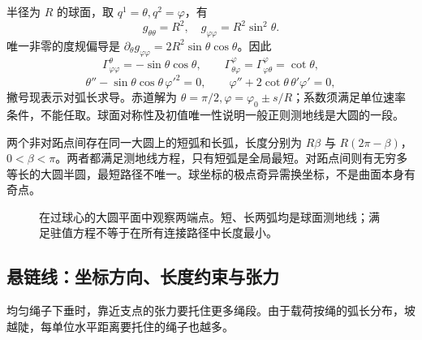 \begin{example}[球面：大圆长弧为何不是最短？]
半径为 $R$ 的球面，取 $q^1=\theta,q^2=\varphi$，有
\[
g_{\theta\theta}=R^2,\quad g_{\varphi\varphi}=R^2\sin^2\theta.
\]
唯一非零的度规偏导是 $\partial_\theta g_{\varphi\varphi}=2R^2\sin\theta\cos\theta$。因此
\[
\Gamma^\theta_{\varphi\varphi}=-\sin\theta\cos\theta,\qquad
\Gamma^\varphi_{\theta\varphi}=\Gamma^\varphi_{\varphi\theta}=\cot\theta,
\]
\[
\theta''-\sin\theta\cos\theta\,\varphi'^2=0,\qquad
\varphi''+2\cot\theta\,\theta'\varphi'=0,
\]
撇号现表示对弧长求导。赤道解为 $\theta=\pi/2,\varphi=\varphi_0\pm s/R$；系数须满足单位速率条件，不能任取。球面对称性及初值唯一性说明一般正则测地线是大圆的一段。

两个非对跖点间存在同一大圆上的短弧和长弧，长度分别为 $R\beta$ 与 $R(2\pi-\beta)$，$0<\beta<\pi$。两者都满足测地线方程，只有短弧是全局最短。对跖点间则有无穷多等长的大圆半圆，最短路径不唯一。球坐标的极点奇异需换坐标，不是曲面本身有奇点。
\end{example}
\begin{figure}[htbp]
\centering
{}
\caption{在过球心的大圆平面中观察两端点。短、长两弧均是球面测地线；满足驻值方程不等于在所有连接路径中长度最小。}
\label{fig:var-great-circle}
\end{figure}

\subsection{悬链线：坐标方向、长度约束与张力}
均匀绳子下垂时，靠近支点的张力要托住更多绳段。由于载荷按绳的弧长分布，坡越陡，每单位水平距离要托住的绳子也越多。


